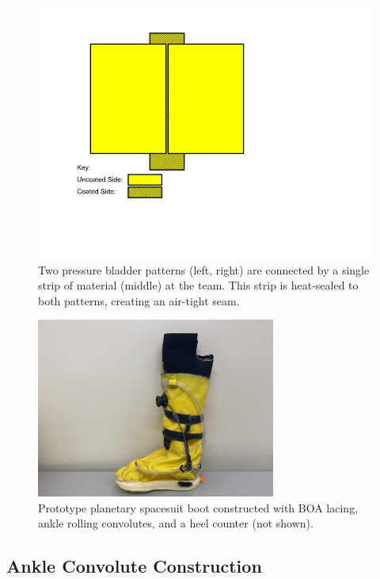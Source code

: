 \documentclass[defaultstyle,11pt]{comps}
\begin{document}
\begin{figure}
\hypertarget{fig:SA3-seam}{%
\centering
\includegraphics{../fig/SA3/BladderSeam.png}
\caption{Two pressure bladder patterns (left, right) are connected by a single strip of material (middle) at the team. This strip is heat-sealed to both patterns, creating an air-tight seam.}\label{fig:SA3-seam}
}
\end{figure}

\begin{figure}
\hypertarget{fig:SA3-proto_boot}{%
\centering
\includegraphics[width=0.7\textwidth,height=\textheight]{../fig/SA3/Proto_Spaceboot.jpg}
\caption{Prototype planetary spacesuit boot constructed with BOA lacing, ankle rolling convolutes, and a heel counter (not shown).}\label{fig:SA3-proto_boot}
}
\end{figure}

\hypertarget{ankle-convolute-construction}{%
\subsection{Ankle Convolute Construction}\label{ankle-convolute-construction}}
\end{document}
